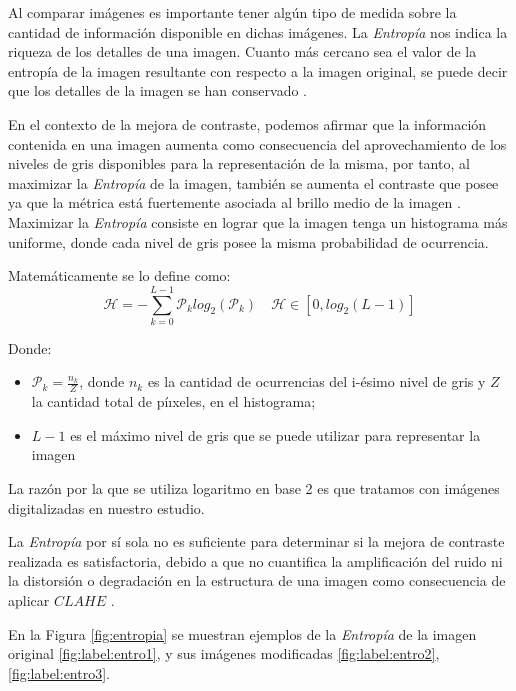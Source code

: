 Al comparar imágenes es importante tener algún tipo de medida sobre la cantidad de información disponible en dichas imágenes. La \textit{Entropía} nos indica la riqueza de los detalles de una imagen. Cuanto más cercano sea el valor de la entropía de la imagen resultante con respecto a la imagen original, se puede decir que los detalles de la imagen se han conservado \cite{daumasjara}.

En el contexto de la mejora de contraste, podemos afirmar que la información contenida en una imagen aumenta como consecuencia del aprovechamiento de los niveles de gris disponibles para la representación de la misma, por tanto, al maximizar la \textit{Entropía} de la imagen, también se aumenta el contraste que posee \cite{daumasjara} ya que la métrica está fuertemente asociada al brillo medio de la imagen \cite{108593}. Maximizar la \textit{Entropía} consiste en lograr que la imagen tenga un histograma más uniforme, donde cada nivel de gris posee la misma probabilidad de ocurrencia.

Matemáticamente se lo define como:
\begin{equation}\label{eq:entropia}
\mathscr{H}=-\sum_{k=0}^{L-1}\mathcal{P}_k log_2(\mathcal{P}_k)  \quad \mathscr{H} \in \left[0,log_2(L-1) \right]
\end{equation}


Donde: 
\begin{itemize} 
    \item $\mathcal{P}_k=\frac{n_k}{Z}$, donde $n_k$ es la cantidad de ocurrencias del i-ésimo nivel de gris y $Z$ la cantidad total de píıxeles, en el histograma;
    \item $L-1$ es el máximo nivel de gris que se puede utilizar para representar la imagen
\end{itemize}

La razón por la que se utiliza logaritmo en base 2 es que tratamos con imágenes digitalizadas en nuestro estudio.

La \textit{Entropía} por sí sola no es suficiente para determinar si la mejora de contraste realizada es satisfactoria, debido a que no cuantifica la amplificación del ruido ni la distorsión o degradación en la estructura de una imagen como consecuencia de aplicar $CLAHE$ \cite{morebrizuela2014}.

En la Figura \ref{fig:entropia} se muestran ejemplos de la \textit{Entropía} de la imagen original \ref{fig:label:entro1}, y sus imágenes modificadas \ref{fig:label:entro2}, \ref{fig:label:entro3}.

